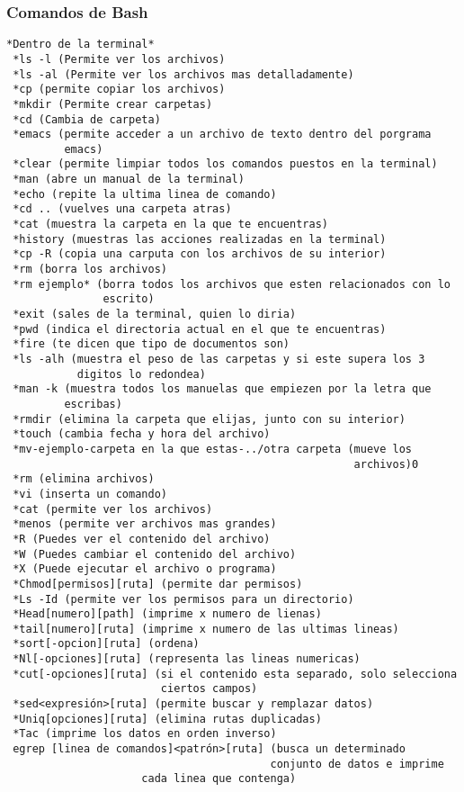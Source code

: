 \documentclass{article}
\begin{document}
\subsubsection{Comandos de Bash}
\begin{verbatim}
*Dentro de la terminal*
 *ls -l (Permite ver los archivos)
 *ls -al (Permite ver los archivos mas detalladamente)
 *cp (permite copiar los archivos)
 *mkdir (Permite crear carpetas)
 *cd (Cambia de carpeta)
 *emacs (permite acceder a un archivo de texto dentro del porgrama
         emacs)
 *clear (permite limpiar todos los comandos puestos en la terminal)
 *man (abre un manual de la terminal)
 *echo (repite la ultima linea de comando)
 *cd .. (vuelves una carpeta atras)
 *cat (muestra la carpeta en la que te encuentras)
 *history (muestras las acciones realizadas en la terminal)
 *cp -R (copia una carputa con los archivos de su interior)
 *rm (borra los archivos)
 *rm ejemplo* (borra todos los archivos que esten relacionados con lo
               escrito)
 *exit (sales de la terminal, quien lo diria)
 *pwd (indica el directoria actual en el que te encuentras)
 *fire (te dicen que tipo de documentos son)
 *ls -alh (muestra el peso de las carpetas y si este supera los 3
           digitos lo redondea)
 *man -k (muestra todos los manuelas que empiezen por la letra que
         escribas)
 *rmdir (elimina la carpeta que elijas, junto con su interior)
 *touch (cambia fecha y hora del archivo)
 *mv-ejemplo-carpeta en la que estas-../otra carpeta (mueve los
                                                      archivos)0
 *rm (elimina archivos)
 *vi (inserta un comando)
 *cat (permite ver los archivos)
 *menos (permite ver archivos mas grandes)
 *R (Puedes ver el contenido del archivo)
 *W (Puedes cambiar el contenido del archivo)
 *X (Puede ejecutar el archivo o programa)
 *Chmod[permisos][ruta] (permite dar permisos)
 *Ls -Id (permite ver los permisos para un directorio)
 *Head[numero][path] (imprime x numero de lienas)
 *tail[numero][ruta] (imprime x numero de las ultimas lineas)
 *sort[-opcion][ruta] (ordena)
 *Nl[-opciones][ruta] (representa las lineas numericas)
 *cut[-opciones][ruta] (si el contenido esta separado, solo selecciona
                        ciertos campos)
 *sed<expresión>[ruta] (permite buscar y remplazar datos)
 *Uniq[opciones][ruta] (elimina rutas duplicadas)
 *Tac (imprime los datos en orden inverso)
 egrep [linea de comandos]<patrón>[ruta] (busca un determinado
                                         conjunto de datos e imprime
					 cada linea que contenga)

\end{verbatim}
\end{document}
